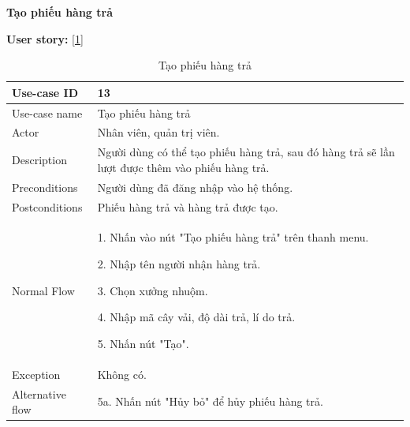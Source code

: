 \newpage
\textbf{Tạo phiếu hàng trả}\par
\textbf{User story:} [\ref{bang13}]
\begin{table}[!htp]
    \centering
    \begin{tabular}{|m{3cm}|m{10cm}|}
    \hline 
        Use-case ID & 13\\ \hline
        Use-case name & Tạo phiếu hàng trả\\ \hline
        Actor & Nhân viên, quản trị viên.\\ \hline
        Description & Người dùng có thể tạo phiếu hàng trả, sau đó hàng trả sẽ lần lượt được thêm vào phiếu hàng trả.\\ \hline
        Preconditions & Người dùng đã đăng nhập vào hệ thống.\\ \hline
        Postconditions & Phiếu hàng trả và hàng trả được tạo.\\ \hline
        Normal Flow & 
        1. Nhấn vào nút "Tạo phiếu hàng trả" trên thanh menu.\par 
        2. Nhập tên người nhận hàng trả.\par
        3. Chọn xưởng nhuộm.\par 
        4. Nhập mã cây vải, độ dài trả, lí do trả.\par
        5. Nhấn nút "Tạo".
        \\ \hline
        Exception & Không có.
        \\ \hline
        Alternative flow & 
        5a. Nhấn nút "Hủy bỏ" để hủy phiếu hàng trả.
        \\ 
    \hline 
    \end{tabular}
    \caption{Tạo phiếu hàng trả}
    \label{bang13}
\end{table}

